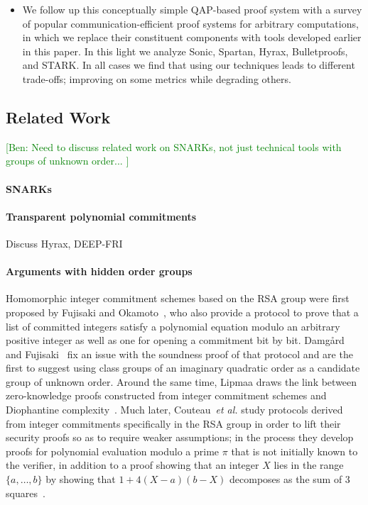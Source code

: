 \documentclass{article}
\theoremstyle{definition}
\newcommand{\ben}[1]{{\textcolor{green}{[Ben: #1]}}}
\newcommand{\alan}[1]{{\todo[color=blue!40!white]{Alan: #1}}}
\newcommand{\ben}[1]{}
\newcommand{\alan}[1]{}
\begin{document}
\begin{itemize}
    \item[] \alan{deprecated} We follow up this conceptually simple QAP-based proof system with a survey of popular communication-efficient proof systems for arbitrary computations, in which we replace their constituent components with tools developed earlier in this paper. In this light we analyze Sonic, Spartan, Hyrax, Bulletproofs, and STARK. In all cases we find that using our techniques leads to different trade-offs; improving on some metrics while degrading others.
\end{itemize}

\subsection{Related Work}

\ben{Need to discuss related work on SNARKs, not just technical tools with groups of unknown order... } 
\paragraph{SNARKs} 
\paragraph{Transparent polynomial commitments} 
Discuss Hyrax, DEEP-FRI 

\paragraph{Arguments with hidden order groups} 
Homomorphic integer commitment schemes based on the RSA group were first proposed by Fujisaki and Okamoto~\cite{C:FujOka97}, who also provide a protocol to prove that a list of committed integers satisfy a polynomial equation modulo an arbitrary positive integer as well as one for opening a commitment bit by bit. Damgård and Fujisaki~\cite{AC:DamFuj02} fix an issue with the soundness proof of that protocol and are the first to suggest using class groups of an imaginary quadratic order as a candidate group of unknown order. Around the same time, Lipmaa draws the link between zero-knowledge proofs constructed from integer commitment schemes and Diophantine complexity~\cite{AC:Lipmaa03b}. Much later, Couteau~\emph{et al.} study protocols derived from integer commitments specifically in the RSA group in order to lift their security proofs so as to require weaker assumptions; in the process they develop proofs for polynomial evaluation modulo a prime $\pi$ that is not initially known to the verifier, in addition to a proof showing that an integer $X$ lies in the range $\{a, \ldots, b\}$ by showing that $1+4(X-a)(b-X)$ decomposes as the sum of 3 squares~\cite{EC:CouPetPoi17}.
\end{document}
